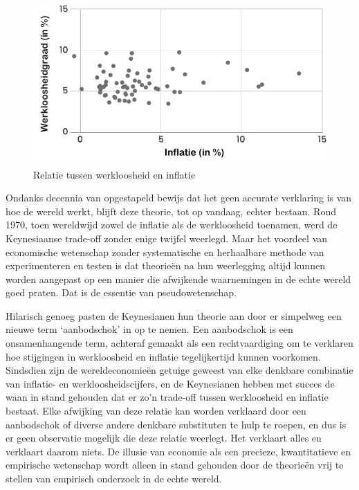 \begin{figure}[!htb]
\centering
    \includegraphics[width=\textwidth]{figures/fig1.pdf}
\caption[Relatie tussen werkloosheid en inflatie]{Relatie tussen werkloosheid en inflatie\footnotemark}
\label{fig1}
\end{figure}


Ondanks decennia van opgestapeld bewijs dat het geen accurate verklaring is van hoe de wereld werkt, blijft deze theorie, tot op vandaag, echter bestaan. Rond 1970, toen wereldwijd zowel de inflatie als de werkloosheid toenamen, werd de Keynesiaanse trade-off zonder enige twijfel weerlegd. Maar het voordeel van economische wetenschap zonder systematische en herhaalbare methode van experimenteren en testen is dat theorieën na hun weerlegging altijd kunnen worden aangepast op een manier die afwijkende waarnemingen in de echte wereld goed praten. Dat is de essentie van pseudowetenschap.

Hilarisch genoeg pasten de Keynesianen hun theorie aan door er simpelweg een nieuwe term `aanbodschok' in op te nemen. Een aanbodschok is een onsamenhangende term, achteraf gemaakt als een rechtvaardiging om te verklaren hoe stijgingen in werkloosheid en inflatie tegelijkertijd kunnen voorkomen. Sindsdien zijn de wereldeconomieën getuige geweest van elke denkbare combinatie van inflatie- en werkloosheidscijfers, en de Keynesianen hebben met succes de waan in stand gehouden dat er zo’n trade-off tussen werkloosheid en inflatie bestaat. Elke afwijking van deze relatie kan worden verklaard door een aanbodschok of diverse andere denkbare substituten te hulp te roepen, en dus is er geen observatie mogelijk die deze relatie weerlegt. Het verklaart alles en verklaart daarom niets. De illusie van economie als een precieze, kwantitatieve en empirische wetenschap wordt alleen in stand gehouden door de theorieën vrij te stellen van empirisch onderzoek in de echte wereld.

